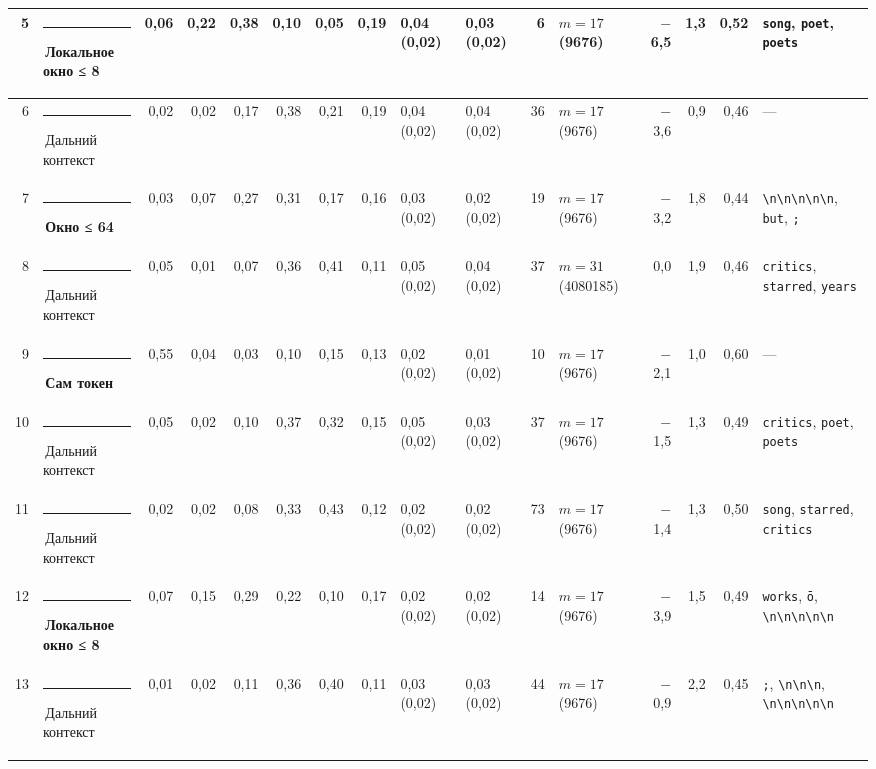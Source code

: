 \documentclass[10pt]{article}
\begin{document}
\begin{minipage}{\linewidth}
\begin{center}
{\begin{tabular}{|r|l|r|r|r|r|r|r|l|l|r|l|r|r|r|l|}
5 & \textcolor[HTML]{1BAF7A}{\rule{0.62em}{0.62em}}\,\textbf{Локальное окно ≤ 8} & 0,06 & 0,22 & 0,38 & 0,10 & 0,05 & 0,19 & 0,04 (0,02) & 0,03 (0,02) & 6 & $m{=}17$ (9676) & $-$6,5 & 1,3 & 0,52 & \texttt{\textvisiblespace{}song}, \texttt{\textvisiblespace{}poet}, \texttt{\textvisiblespace{}poets} \\ \hline
6 & \textcolor[HTML]{C3C2B7}{\rule{0.62em}{0.62em}}\,Дальний контекст & 0,02 & 0,02 & 0,17 & 0,38 & 0,21 & 0,19 & 0,04 (0,02) & 0,04 (0,02) & 36 & $m{=}17$ (9676) & $-$3,6 & 0,9 & 0,46 & — \\ \hline
7 & \textcolor[HTML]{EDA100}{\rule{0.62em}{0.62em}}\,\textbf{Окно ≤ 64} & 0,03 & 0,07 & 0,27 & 0,31 & 0,17 & 0,16 & 0,03 (0,02) & 0,02 (0,02) & 19 & $m{=}17$ (9676) & $-$3,2 & 1,8 & 0,44 & \texttt{\textbackslash{}n\textbackslash{}n\textbackslash{}n\textbackslash{}n\textbackslash{}n}, \texttt{\textvisiblespace{}but}, \texttt{\textvisiblespace{};} \\ \hline
8 & \textcolor[HTML]{C3C2B7}{\rule{0.62em}{0.62em}}\,Дальний контекст & 0,05 & 0,01 & 0,07 & 0,36 & 0,41 & 0,11 & 0,05 (0,02) & 0,04 (0,02) & 37 & $m{=}31$ (4080185) & 0,0 & 1,9 & 0,46 & \texttt{\textvisiblespace{}critics}, \texttt{\textvisiblespace{}starred}, \texttt{\textvisiblespace{}years} \\ \hline
9 & \textcolor[HTML]{2A78D6}{\rule{0.62em}{0.62em}}\,\textbf{Сам токен} & 0,55 & 0,04 & 0,03 & 0,10 & 0,15 & 0,13 & 0,02 (0,02) & 0,01 (0,02) & 10 & $m{=}17$ (9676) & $-$2,1 & 1,0 & 0,60 & — \\ \hline
10 & \textcolor[HTML]{C3C2B7}{\rule{0.62em}{0.62em}}\,Дальний контекст & 0,05 & 0,02 & 0,10 & 0,37 & 0,32 & 0,15 & 0,05 (0,02) & 0,03 (0,02) & 37 & $m{=}17$ (9676) & $-$1,5 & 1,3 & 0,49 & \texttt{\textvisiblespace{}critics}, \texttt{\textvisiblespace{}poet}, \texttt{\textvisiblespace{}poets} \\ \hline
11 & \textcolor[HTML]{C3C2B7}{\rule{0.62em}{0.62em}}\,Дальний контекст & 0,02 & 0,02 & 0,08 & 0,33 & 0,43 & 0,12 & 0,02 (0,02) & 0,02 (0,02) & 73 & $m{=}17$ (9676) & $-$1,4 & 1,3 & 0,50 & \texttt{\textvisiblespace{}song}, \texttt{\textvisiblespace{}starred}, \texttt{\textvisiblespace{}critics} \\ \hline
12 & \textcolor[HTML]{1BAF7A}{\rule{0.62em}{0.62em}}\,\textbf{Локальное окно ≤ 8} & 0,07 & 0,15 & 0,29 & 0,22 & 0,10 & 0,17 & 0,02 (0,02) & 0,02 (0,02) & 14 & $m{=}17$ (9676) & $-$3,9 & 1,5 & 0,49 & \texttt{\textvisiblespace{}works}, \texttt{ō}, \texttt{\textbackslash{}n\textbackslash{}n\textbackslash{}n\textbackslash{}n\textbackslash{}n} \\ \hline
13 & \textcolor[HTML]{C3C2B7}{\rule{0.62em}{0.62em}}\,Дальний контекст & 0,01 & 0,02 & 0,11 & 0,36 & 0,40 & 0,11 & 0,03 (0,02) & 0,03 (0,02) & 44 & $m{=}17$ (9676) & $-$0,9 & 2,2 & 0,45 & \texttt{\textvisiblespace{};}, \texttt{\textvisiblespace{}\textbackslash{}n\textbackslash{}n\textbackslash{}n}, \texttt{\textbackslash{}n\textbackslash{}n\textbackslash{}n\textbackslash{}n\textbackslash{}n} \\ \hline
\hline\end{tabular}}\end{center}
\end{minipage}
\end{document}
